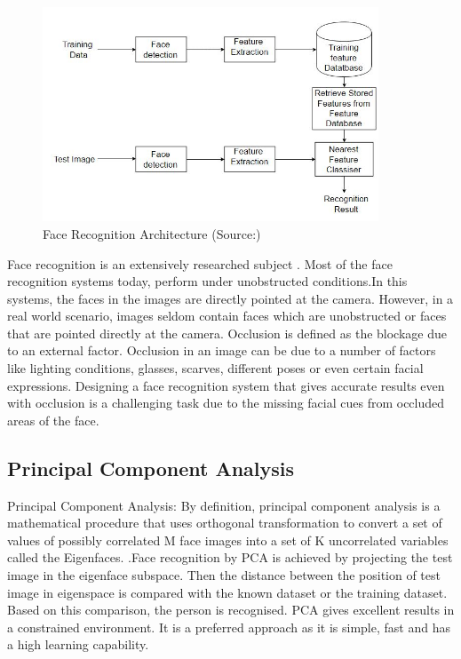 \documentclass[conference]{IEEEtran}
\begin{document}
\begin{figure}[h!]
 \centering
 \includegraphics[width = 10cm]{Face_Recognition_Architecture.JPG}
 \caption{ Face Recognition Architecture (Source:\cite{makwana_makwana_2016})}
 \label{fig 1: face recognition architecture}
\end{figure}

Face recognition is an extensively researched subject\cite{zhao2003face} \cite{abate20072d}.  Most of the face recognition systems today, perform under unobstructed conditions\cite{phillips2005overview}.In this systems, the faces in the images are directly pointed at the camera. However, in a real world scenario, images seldom contain faces which are unobstructed or  faces that are pointed directly at the camera. Occlusion is defined as the blockage due to an external factor. Occlusion in an image can be due to a number of factors like lighting conditions, glasses, scarves, different poses or even certain facial expressions. Designing a face recognition system that gives accurate results even with occlusion is a challenging task due to the missing facial cues from occluded areas of the face.

\subsection{Principal Component Analysis}
\label{subsec: 1a.Principal Component Analysis}
Principal Component Analysis: By definition, principal component analysis is a mathematical procedure that uses orthogonal transformation to convert a set of values of possibly correlated M face images into a set of K uncorrelated variables called the Eigenfaces.
\cite{turk1991face}.Face recognition by PCA is achieved by projecting the test image in the eigenface subspace. Then the distance between the position of test image in eigenspace is compared with the known dataset or the training dataset. Based on this comparison, the person is recognised. PCA gives excellent results in a constrained environment. It is a preferred approach as it is simple, fast and has a high learning capability.
\end{document}

